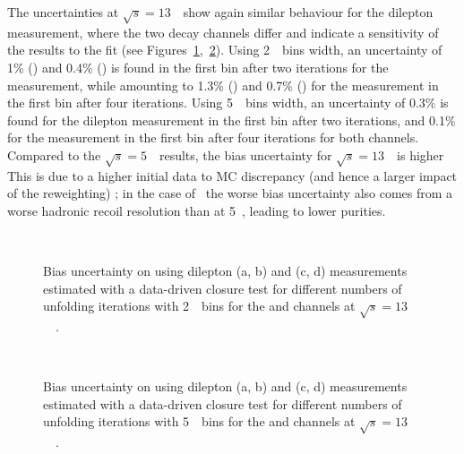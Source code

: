 The uncertainties at $\sqrt{s} = 13$~\TeV\ show again similar behaviour for the dilepton \pt measurement, where the two \Zboson decay channels differ and indicate a sensitivity of the results to the fit (see Figures~\ref{fig:bias_dd_13_2GeV},~\ref{fig:bias_dd_13_5GeV}).
Using 2~\GeV\ bins width, an uncertainty of 1\% (\Zee) and 0.4\% (\Zmm) is found in the first bin after two iterations for the \ptdilep measurement, while amounting to 1.3\% (\Zee) and 0.7\% (\Zmm) for the \ut measurement in the first bin after four iterations. Using 5~\GeV\ bins width, an uncertainty of 0.3\% is found for the dilepton \pt measurement in the first bin after two iterations, and 0.1\% for the \ut measurement in the first bin after four iterations for both channels. Compared to the $\sqrt{s} = 5$~\TeV\ results, the bias uncertainty for $\sqrt{s} = 13$~\TeV\ is higher This is due to a higher initial data to MC discrepancy (and hence a larger impact of the reweighting) ; in the case of \ut\ the worse bias uncertainty also comes from a worse hadronic recoil resolution than at 5~\TeV, leading to lower purities.

\begin{figure}[h]
\centering
{}
\\
\caption{Bias uncertainty on \ptz using dilepton \pt (a, b) and \ut (c, d) measurements estimated with a data-driven closure test for different numbers of unfolding iterations with 2~\GeV\ bins for the \Zee and \Zmm channels at $\sqrt{s} = 13$~\TeV\ .}
\label{fig:bias_dd_13_2GeV}
\end{figure}

\begin{figure}[h]
\centering
{}
\\
\caption{Bias uncertainty on \ptz using dilepton \pt (a, b) and \ut (c, d) measurements estimated with a data-driven closure test for different numbers of unfolding iterations with 5~\GeV\ bins for the \Zee and \Zmm channels at $\sqrt{s} = 13$~\TeV\ .}
\label{fig:bias_dd_13_5GeV}
\end{figure}

